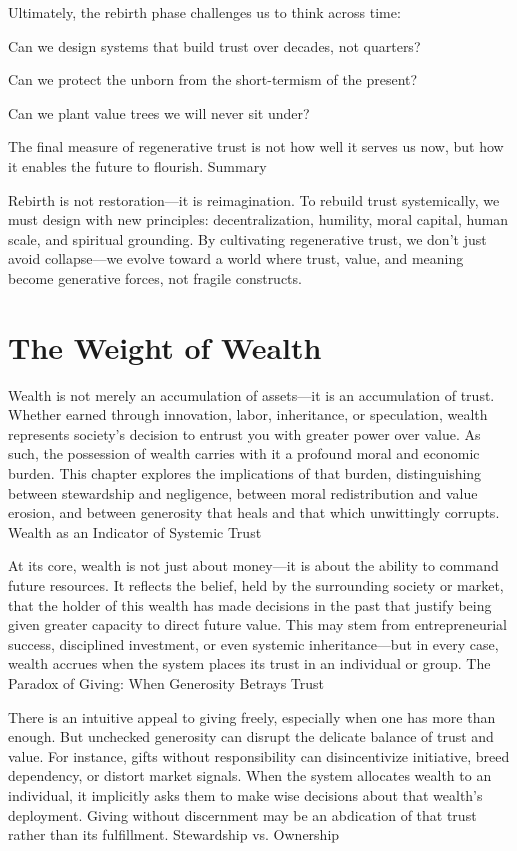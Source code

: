 \documentclass[11pt,oneside]{book}
\begin{document}
Ultimately, the rebirth phase challenges us to think across time:

    Can we design systems that build trust over decades, not quarters?

    Can we protect the unborn from the short-termism of the present?

    Can we plant value trees we will never sit under?

The final measure of regenerative trust is not how well it serves us now, but how it enables the future to flourish.
Summary

Rebirth is not restoration—it is reimagination. To rebuild trust systemically, we must design with new principles: decentralization, humility, moral capital, human scale, and spiritual grounding. By cultivating regenerative trust, we don't just avoid collapse—we evolve toward a world where trust, value, and meaning become generative forces, not fragile constructs.


\chapter{The Weight of Wealth}

Wealth is not merely an accumulation of assets—it is an accumulation of trust. Whether earned through innovation, labor, inheritance, or speculation, wealth represents society’s decision to entrust you with greater power over value. As such, the possession of wealth carries with it a profound moral and economic burden. This chapter explores the implications of that burden, distinguishing between stewardship and negligence, between moral redistribution and value erosion, and between generosity that heals and that which unwittingly corrupts.
Wealth as an Indicator of Systemic Trust

At its core, wealth is not just about money—it is about the ability to command future resources. It reflects the belief, held by the surrounding society or market, that the holder of this wealth has made decisions in the past that justify being given greater capacity to direct future value. This may stem from entrepreneurial success, disciplined investment, or even systemic inheritance—but in every case, wealth accrues when the system places its trust in an individual or group.
The Paradox of Giving: When Generosity Betrays Trust

There is an intuitive appeal to giving freely, especially when one has more than enough. But unchecked generosity can disrupt the delicate balance of trust and value. For instance, gifts without responsibility can disincentivize initiative, breed dependency, or distort market signals. When the system allocates wealth to an individual, it implicitly asks them to make wise decisions about that wealth’s deployment. Giving without discernment may be an abdication of that trust rather than its fulfillment.
Stewardship vs. Ownership
\end{document}
